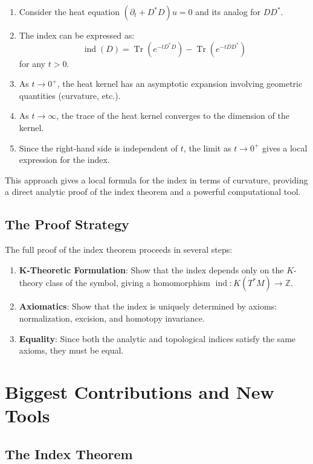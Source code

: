 \begin{enumerate}
\item Consider the heat equation $(\partial_t + D^*D)u = 0$ and its analog for $DD^*$.
\item The index can be expressed as:
\[
\operatorname{ind}(D) = \operatorname{Tr}(e^{-t D^* D}) - \operatorname{Tr}(e^{-t D D^*})
\]
for any $t > 0$.
\item As $t \to 0^+$, the heat kernel has an asymptotic expansion involving geometric quantities (curvature, etc.).
\item As $t \to \infty$, the trace of the heat kernel converges to the dimension of the kernel.
\item Since the right-hand side is independent of $t$, the limit as $t \to 0^+$ gives a local expression for the index.
\end{enumerate}

This approach gives a local formula for the index in terms of curvature, providing a direct analytic proof of the index theorem and a powerful computational tool.

\subsection{The Proof Strategy}

The full proof of the index theorem proceeds in several steps:
\begin{enumerate}
\item \textbf{K-Theoretic Formulation}: Show that the index depends only on the $K$-theory class of the symbol, giving a homomorphism $\operatorname{ind}: K(T^*M) \to \mathbb{Z}$.
\item \textbf{Axiomatics}: Show that the index is uniquely determined by axioms: normalization, excision, and homotopy invariance.
\item \textbf{Equality}: Since both the analytic and topological indices satisfy the same axioms, they must be equal.
\end{enumerate}

\section{Biggest Contributions and New Tools}

\subsection{The Index Theorem}

